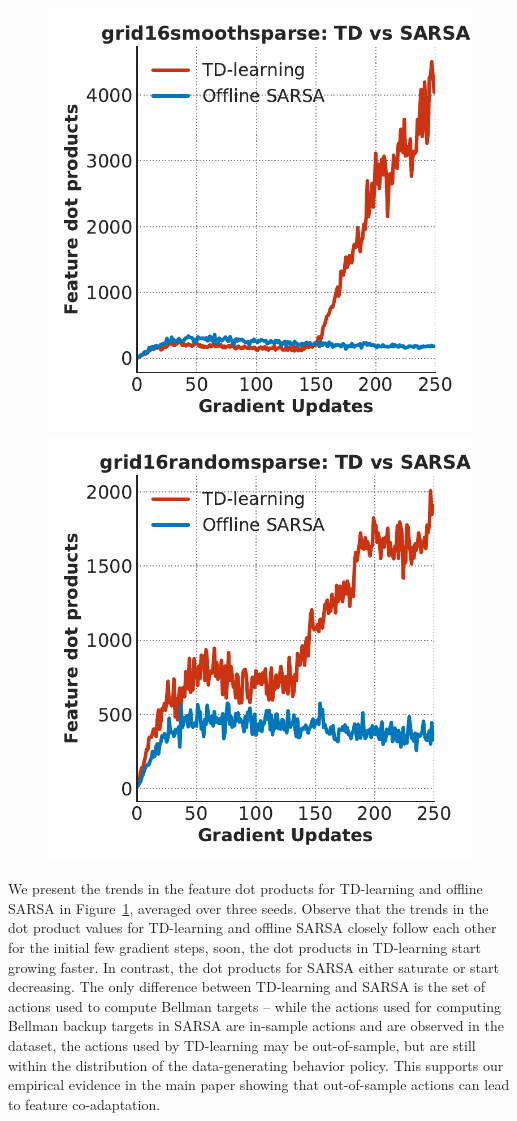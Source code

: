 \begin{figure}
    \centering
    \vspace{-0.5cm}
    \includegraphics[width=0.47\linewidth]{chapters/dr3/rebuttal/smoothsparse_td_vs_q.pdf}
    \includegraphics[width=0.47\linewidth]{chapters/dr3/rebuttal/randomsparse_td_vs_q.pdf}
    \vspace{-0.3cm}
    \caption{\label{fig:out_of_sample_actions} \footnotesize{}} 
\end{figure}
We present the trends in the feature dot products for TD-learning and offline SARSA in Figure~\ref{fig:out_of_sample_actions}, averaged over three seeds. Observe that the trends in the dot product values for TD-learning and offline SARSA closely follow each other for the initial few gradient steps, soon, the dot products in TD-learning start growing faster. In contrast, the dot products for SARSA either saturate or start decreasing. The only difference between TD-learning and SARSA is the set of actions used to compute Bellman targets -- while the actions used for computing Bellman backup targets in SARSA are in-sample actions and are observed in the dataset, the actions used by TD-learning may be out-of-sample, but are still within the distribution of the data-generating behavior policy. This supports our empirical evidence in the main paper showing that out-of-sample actions can lead to feature co-adaptation.


